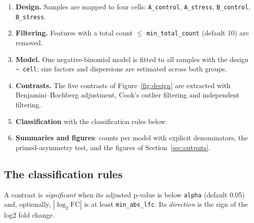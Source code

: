 \documentclass[11pt,a4paper]{article}
\newcommand{\code}[1]{\texttt{\color{navy!85!black}#1}}
\begin{document}
\begin{enumerate}
  \item \textbf{Design.} Samples are mapped to four cells: \code{A\_control}, \code{A\_stress},
        \code{B\_control}, \code{B\_stress}.
  \item \textbf{Filtering.} Features with a total count \(\le\) \code{min\_total\_count} (default 10)
        are removed.
  \item \textbf{Model.} One negative-binomial model is fitted to all samples with the design
        \code{\textasciitilde{} cell}; size factors and dispersions are estimated across both groups.
  \item \textbf{Contrasts.} The five contrasts of Figure~\ref{fig:design} are extracted with
        Benjamini--Hochberg adjustment, Cook's outlier filtering and independent filtering.
  \item \textbf{Classification} with the classification rules below.
  \item \textbf{Summaries and figures}: counts per model with explicit denominators, the
        primed-asymmetry test, and the figures of Section~\ref{sec:outputs}.
\end{enumerate}

\subsection{The classification rules}

A contrast is \emph{significant} when its adjusted p-value is below \code{alpha} (default 0.05) and,
optionally, \(|\log_2\mathrm{FC}|\) is at least \code{min\_abs\_lfc}. Its \emph{direction} is the sign of
the log2 fold change.
\end{document}
